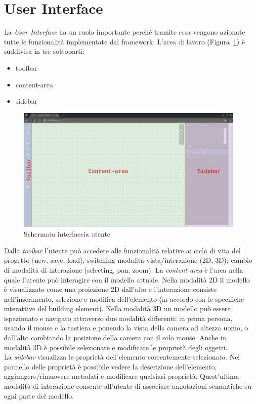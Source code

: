 \section{User Interface}
\label{sec:chapter_2_section_2}

La \emph{User Interface} ha un ruolo importante perché tramite essa vengono azionate tutte le funzionalità
implementate dal framework. L'area di lavoro (Figura~\ref{fig:interfaccia}) è suddivisa in tre sottoparti:
\begin{itemize}
  \item toolbar
  \item content-area
  \item sidebar
\end{itemize}

\begin{figure}[htbp] %
   \centering
   \includegraphics[width=1\linewidth]{images/mock-interfaccia}
   \caption{Schermata interfaccia utente}
   \label{fig:interfaccia}
\end{figure}

Dalla \emph{toolbar} l'utente pu\`o accedere alle funzionalit\`a relative a: ciclo di vita del progetto (new, save, load);
switching modalità vista/interazione (2D, 3D); cambio di modalità di interazione (selecting, pan, zoom).
\newpage
La \emph{content-area} \`e l'area nella quale l'utente pu\`o interagire con il modello attuale. Nella modalit\`a 2D
il modello \`e visualizzato come una proiezione 2D dall'alto e l'interazione consiste nell'inserimento, selezione e modifica
dell'elemento (in accordo con le specifiche interattive del building element). Nella modalità 3D un modello pu\`o essere
ispezionato e navigato attraverso due modalità differenti: in prima persona, usando il mouse e la tastiera e ponendo la vista della camera
ad altezza uomo, o dall'alto cambiando la posizione della camera con il solo mouse. Anche in modalità 3D è possibile
selezionare e modificare le proprietà degli oggetti.\\
\indent
La \emph{sidebar} visualizza le propriet\`a dell'elemento correntemente selezionato. Nel pannello delle propriet\`a \`e possibile
vedere la descrizione dell'elemento, aggiungere/rimuovere metadati e modificare qualsiasi propriet\`a.
Quest'ultima modalità di interazione consente all'utente di associare annotazioni semantiche su ogni parte del modello.
\newpage

